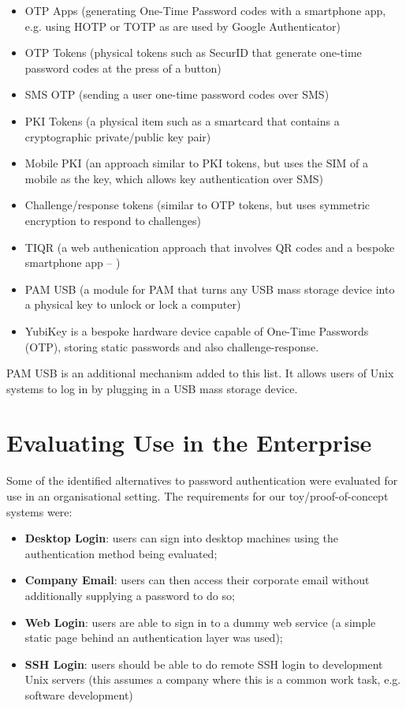 \documentclass{report}
\begin{document}
\begin{itemize}
  \item OTP Apps (generating One-Time Password codes with a smartphone app, e.g.
    using HOTP or TOTP as are used by Google Authenticator)
  \item OTP Tokens (physical tokens such as SecurID that generate one-time
    password codes at the press of a button)
  \item SMS OTP (sending a user one-time password codes over SMS)
  \item PKI Tokens (a physical item such as a smartcard that contains
    a cryptographic private/public key pair)
  \item Mobile PKI (an approach similar to PKI tokens, but uses the SIM of a
    mobile as the key, which allows key authentication over SMS)
  \item Challenge/response tokens (similar to OTP tokens, but uses symmetric
    encryption to respond to challenges)
  \item TIQR (a web authenication approach that involves QR codes and a
    bespoke smartphone app -- \textcite{van2011tiqr})
  \item PAM USB (a module for PAM that turns any USB mass storage device
    into a physical key to unlock or lock a computer)
  \item YubiKey is a bespoke hardware device capable of One-Time Passwords (OTP),
    storing static passwords and also challenge-response.
\end{itemize}

PAM USB \parencite{steele2005paranoid} is an additional mechanism added to
this list. It allows users of Unix systems to log in by plugging in a USB
mass storage device.

\section{Evaluating Use in the Enterprise}
\label{sec:evaluation}

Some of the identified alternatives to password authentication were
evaluated for use in an organisational setting.
The requirements for our toy/proof-of-concept systems were:

\begin{itemize}
  \item \textbf{Desktop Login}: users can sign into desktop machines using the authentication method
    being evaluated;
  \item \textbf{Company Email}: users can then access their corporate email without additionally
    supplying a password to do so;
  \item \textbf{Web Login}: users are able to sign in to a dummy web service (a simple static page
    behind an authentication layer was used);
  \item \textbf{SSH Login}: users should be able to do remote SSH login to development Unix
    servers (this assumes a company where this is a common work task, e.g.
    software development)
\end{itemize}
\end{document}
